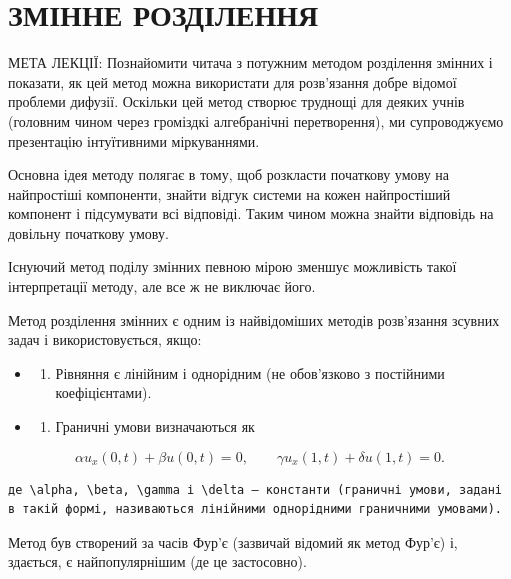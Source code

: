 \documentclass[
  ukrainian,
]{article}
\providecommand{\tightlist}{%
  \setlength{\itemsep}{0pt}\setlength{\parskip}{0pt}}
\begin{document}
\section{ЗМІННЕ
РОЗДІЛЕННЯ}\label{ux437ux43cux456ux43dux43dux435-ux440ux43eux437ux434ux456ux43bux435ux43dux43dux44f}

МЕТА ЛЕКЦІЇ: Познайомити читача з потужним методом розділення змінних і
показати, як цей метод можна використати для розв'язання добре відомої
проблеми дифузії. Оскільки цей метод створює труднощі для деяких учнів
(головним чином через громіздкі алгебранічні перетворення), ми
супроводжуємо презентацію інтуїтивними міркуваннями.

Основна ідея методу полягає в тому, щоб розкласти початкову умову на
найпростіші компоненти, знайти відгук системи на кожен найпростіший
компонент і підсумувати всі відповіді. Таким чином можна знайти
відповідь на довільну початкову умову.

Існуючий метод поділу змінних певною мірою зменшує можливість такої
інтерпретації методу, але все ж не виключає його.

Метод розділення змінних є одним із найвідоміших методів розв'язання
зсувних задач і використовується, якщо:

\begin{itemize}
\tightlist
\item
  \begin{enumerate}
  \def\labelenumi{\arabic{enumi}.}
  \tightlist
  \item
    Рівняння є лінійним і однорідним (не обов'язково з постійними
    коефіцієнтами).
  \end{enumerate}
\item
  \begin{enumerate}
  \def\labelenumi{\arabic{enumi}.}
  \setcounter{enumi}{1}
  \tightlist
  \item
    Граничні умови визначаються як
  \end{enumerate}
\end{itemize}

\[
\alpha u_x(0, t) + \beta u(0, t) = 0, \qquad \gamma u_x(1, t) + \delta u(1, t) = 0.
\]

\begin{verbatim}
де \alpha, \beta, \gamma і \delta — константи (граничні умови, задані в такій формі, називаються лінійними однорідними граничними умовами).
\end{verbatim}

Метод був створений за часів Фур'є (зазвичай відомий як метод Фур'є) і,
здається, є найпопулярнішим (де це застосовно).
\end{document}
